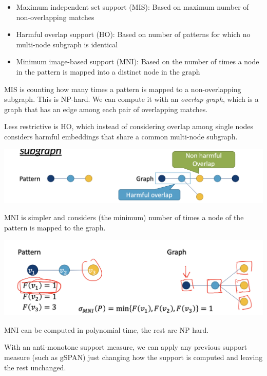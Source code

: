     \begin{itemize}
        \item Maximum independent set support (MIS): Based on maximum number of non-overlapping matches
        \item Harmful overlap support (HO): Based on number of patterns for which no multi-node subgraph is identical
        \item Minimum image-based support (MNI): Based on the number of times a node in the pattern is mapped into a distinct node in the graph
    \end{itemize}
    
    MIS is counting how many times a pattern is mapped to a non-overlapping subgraph. This is NP-hard. We can compute it with an \emph{overlap graph}, which is a graph that has an edge among each pair of overlapping matches. 
    
    Less restrictive is HO, which instead of considering overlap among single nodes considers harmful embeddings that share a common multi-node subgraph. 
    
    \begin{center}
        \includegraphics[width=1\textwidth]{images/HO.png}
    \end{center}
    
    MNI is simpler and considers (the minimum) number of times a node of the pattern is mapped to the graph. 
    
    \begin{center}
        \includegraphics[width=1\textwidth]{images/minmatch.png}
    \end{center}
    
    MNI can be computed in polynomial time, the rest are NP hard.
    
    With an anti-monotone support measure, we can apply any previous support measure (such as gSPAN) just changing how the support is computed and leaving the rest unchanged. 
    
